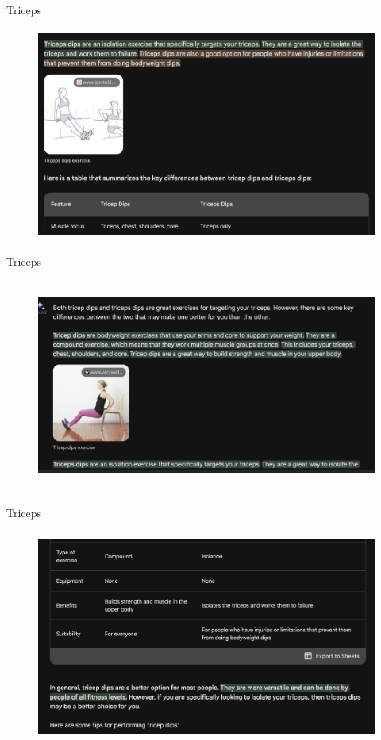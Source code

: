 \begin{vbframe}{Triceps}
\begin{figure}
\centering
\includegraphics[height = 7cm]{figure/triceps1.png}
\end{figure}
\vfill
\end{vbframe}

\begin{vbframe}{Triceps}
\begin{figure}
\centering
\includegraphics[height = 7cm]{figure/triceps2.png}
\end{figure}
\vfill
\end{vbframe}

\begin{vbframe}{Triceps}
\begin{figure}
\centering
\includegraphics[height = 7cm]{figure/triceps3.png}
\end{figure}
\vfill
\end{vbframe}




